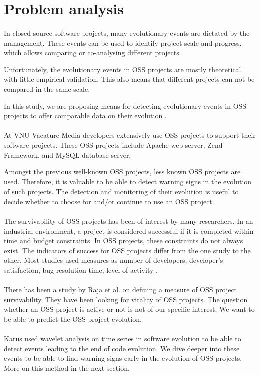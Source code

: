 \section{Problem analysis}
\paragraph{}
In closed source software projects, many evolutionary events are dictated by the
management. These events can be used to identify project scale and progress,
which allows comparing or co-analysing different projects.

Unfortunately, the evolutionary events in OSS projects are mostly theoretical
with little empirical validation. This also means that different projects can
not be compared in the same scale.

In this study, we are proposing means for detecting evolutionary events in OSS
projects to offer comparable data on their evolution \cite{karus2013}.

\paragraph{}
At VNU Vacature Media developers extensively use OSS projects to support their
software projects. These OSS projects include Apache web server, Zend Framework,
and MySQL database server.

Amongst the previous well-known OSS projects, less known OSS projects are used.
Therefore, it is valuable to be able to detect warning signs in the
evolution of such projects. The detection and monitoring of their evolution is
useful to decide whether to choose for and/or continue to use an OSS project.

\paragraph{}
The survivability of OSS projects has been of interest by many researchers. In
an industrial environment, a project is considered successful if it is completed
within time and budget constraints. In OSS projects, these constraints do not
always exist. The indicators of success for OSS projects differ from the one
study to the other. Most studies used measures as number of developers,
developer's satisfaction, bug resolution time, level of activity
\cite{samoladas2010}.

\paragraph{}
There has been a study by Raja et al. \cite{raja2012} on defining a measure of
OSS project survivability. They have been looking for vitality of OSS projects.
The question whether an OSS project is active or not is not of our specific
interest. We want to be able to predict the OSS project evolution.

\paragraph{}
Karus used wavelet analysis on time series in software evolution to be able to
detect events leading to the end of code evolution. We dive deeper into these
events to be able to find warning signs early in the evolution of OSS projects.
More on this method in the next section.
